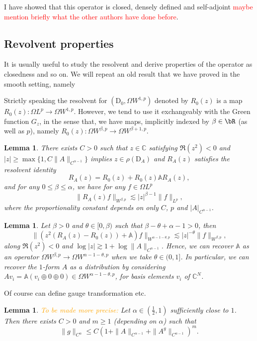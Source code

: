 \documentclass[12pt]{article}
\numberwithin{equation}{section}
\newtheorem{lemma}[theorem]{Lemma}
\theoremstyle{definition}
\theoremstyle{remark}
\newcommand{\1}{\mathbf 1}
\newcommand{\<}{\langle}
\renewcommand{\>}{\rangle}
\newcommand{\red}[1]{\textcolor{red}{#1}}
\newcommand{\orange}[1]{\textcolor{orange}{#1}}
\newcommand{\bA}{\mathbb A}
\newcommand{\rmD}{\mathrm{D}}
\newcommand{\bC}{\mathbb C}
\begin{document}
I have showed that this operator is closed, densely defined and self-adjoint \red{maybe mention briefly what the other authors have done before}. 

\subsection{Revolvent properties}
It is usually useful to study the resolvent and derive properties of the operator as closedness and so on. We will repeat an old result that we have proved in the smooth setting, namely 

\begin{notation}
Strictly speaking the resolvent for $(\rmD_0,\Omega W^{1,p})$ denoted by $R_0(z)$ is a map $R_0(z):\Omega L^p\to \Omega W^{1,p}$. However, we tend to use it exchangeably with the Green function $G_z$, in the sense that, we have maps, implicitly indexed by $\beta\in\bR$ (as well as $p$), namely $R_0(z):\Omega W^{\beta,p}\to\Omega W^{\beta+1,p}$. 
\end{notation}

\begin{lemma}\label{lem:existence_resolvent_Young}
    There exists $C>0$ such that $z\in\bC$ satisfying $\Re(z^2)<0$ and $|z|\geq \max\{1,C\|A\|_{C^{\alpha-1}}\}$ implies $z\in\rho(\rmD_A)$ and $R_A(z)$ satisfies the resolvent identity
    \[
    R_A(z)=R_0(z)+R_0(z)\bA R_A(z),
    \]
    and for any $0\leq\beta\leq\alpha$, we have for any $f\in \Omega L^p$ 
    \[
    \|R_A(z)f\|_{ W^{\beta,p}}\lesssim |z|^{\beta-1}\|f\|_{L^p}, 
    \]
    where the proportionality constant  depends on only $C$, $p$ and $|A|_{C^{\alpha-1}}$. 
    \end{lemma}

\begin{lemma}\label{lem:recover_A_Young}
Let $\beta>0$  and $\theta\in [0,\beta)$ such that  $\beta-\theta+\alpha-1>0$, then 
\[
\|(z^2(R_A(z)-R_0(z))+\bA)f\|_{W^{\alpha-1-\theta,p}}\lesssim |z|^{-\theta}\|f\|_{W^{\beta,p}},
\]
along $\Re(z^2)<0$ and $\log |z|\gtrsim 1+\log\|A\|_{C^{\alpha-1}}$. Hence, we can recover $\bA$ as an operator $\Omega W^{\beta,p}\to \Omega W^{\alpha-1-\theta,p}$ when we take $\theta\in(0,1]$. In particular, we can recover the $1$-form $A$ as a distribution by considering $Av_i=\bA(v_i\oplus 0\oplus 0)\in \Omega W^{\alpha-1-\theta,p}$, for basis elements $v_i$ of $\bC^N$. 
\end{lemma}
Of course can define gauge transformation etc. 


\begin{lemma}\orange{To be made more precise:}
 Let $\alpha\in (\frac 12,1)$ sufficiently close to $1$. Then there exists $C>0$ and $m\geq 1$ (depending on $\alpha$) such that 
 \[
 \|g\|_{C^{\alpha}}\leq C(1+\|A\|_{C^{\alpha-1}}+\|A^g\|_{C^{\alpha-1}})^m.
 \]
\end{lemma}
\end{document}

